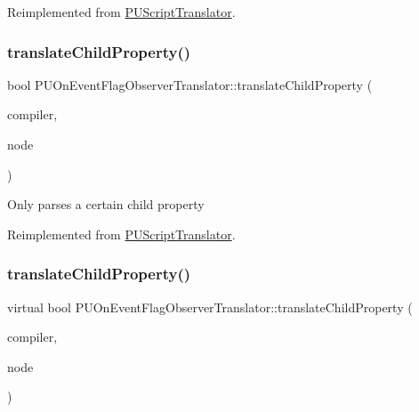 Reimplemented from \hyperlink{classPUScriptTranslator_ab587d01348ae3e678cb700c719b2b113}{P\+U\+Script\+Translator}.

\mbox{\label{classPUOnEventFlagObserverTranslator_ae8d1c5d8178348da122d646fe9328c7f}} 
\subsubsection{\texorpdfstring{translate\+Child\+Property()}{translateChildProperty()}\hspace{0.1cm}{\footnotesize\ttfamily [1/2]}}
{\footnotesize\ttfamily bool P\+U\+On\+Event\+Flag\+Observer\+Translator\+::translate\+Child\+Property (\begin{DoxyParamCaption}\item[{\hyperlink{classPUScriptCompiler}{P\+U\+Script\+Compiler} $\ast$}]{compiler,  }\item[{\hyperlink{classPUAbstractNode}{P\+U\+Abstract\+Node} $\ast$}]{node }\end{DoxyParamCaption})\hspace{0.3cm}{\ttfamily [virtual]}}

Only parses a certain child property 

Reimplemented from \hyperlink{classPUScriptTranslator_a0374d83a8a04e57918975d525e0f8fe8}{P\+U\+Script\+Translator}.

\mbox{\label{classPUOnEventFlagObserverTranslator_aa50d068f20c97b68c46888b1b1843a6c}} 
\subsubsection{\texorpdfstring{translate\+Child\+Property()}{translateChildProperty()}\hspace{0.1cm}{\footnotesize\ttfamily [2/2]}}
{\footnotesize\ttfamily virtual bool P\+U\+On\+Event\+Flag\+Observer\+Translator\+::translate\+Child\+Property (\begin{DoxyParamCaption}\item[{\hyperlink{classPUScriptCompiler}{P\+U\+Script\+Compiler} $\ast$}]{compiler,  }\item[{\hyperlink{classPUAbstractNode}{P\+U\+Abstract\+Node} $\ast$}]{node }\end{DoxyParamCaption})\hspace{0.3cm}{\ttfamily [virtual]}}

